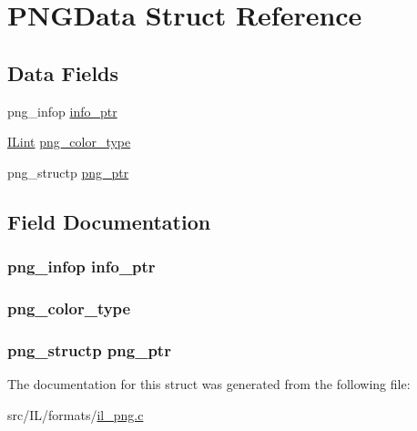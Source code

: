 \hypertarget{struct_p_n_g_data}{\section{P\-N\-G\-Data Struct Reference}
\label{struct_p_n_g_data}
}
\subsection*{Data Fields}
\begin{DoxyCompactItemize}
\item 
png\-\_\-infop \hyperlink{struct_p_n_g_data_acff20584e44b8e5b6ebd0ef649fd89f9}{info\-\_\-ptr}
\item 
\hyperlink{il_8h_a288a97fb9e92e707a60b749d0039fafe}{I\-Lint} \hyperlink{struct_p_n_g_data_a721b9ae879617a68d1552281c95c42a5}{png\-\_\-color\-\_\-type}
\item 
png\-\_\-structp \hyperlink{struct_p_n_g_data_a55aeeb404d5f026787361dda7a4f1cb8}{png\-\_\-ptr}
\end{DoxyCompactItemize}


\subsection{Field Documentation}
\hypertarget{struct_p_n_g_data_acff20584e44b8e5b6ebd0ef649fd89f9}{
\subsubsection[{info\-\_\-ptr}]{\setlength{\rightskip}{0pt plus 5cm}png\-\_\-infop info\-\_\-ptr}}\label{struct_p_n_g_data_acff20584e44b8e5b6ebd0ef649fd89f9}
\hypertarget{struct_p_n_g_data_a721b9ae879617a68d1552281c95c42a5}{
\subsubsection[{png\-\_\-color\-\_\-type}]{ png\-\_\-color\-\_\-type}}\label{struct_p_n_g_data_a721b9ae879617a68d1552281c95c42a5}
\hypertarget{struct_p_n_g_data_a55aeeb404d5f026787361dda7a4f1cb8}{
\subsubsection[{png\-\_\-ptr}]{\setlength{\rightskip}{0pt plus 5cm}png\-\_\-structp png\-\_\-ptr}}\label{struct_p_n_g_data_a55aeeb404d5f026787361dda7a4f1cb8}


The documentation for this struct was generated from the following file\-:\begin{DoxyCompactItemize}
\item 
src/\-I\-L/formats/\hyperlink{il__png_8c}{il\-\_\-png.\-c}\end{DoxyCompactItemize}

